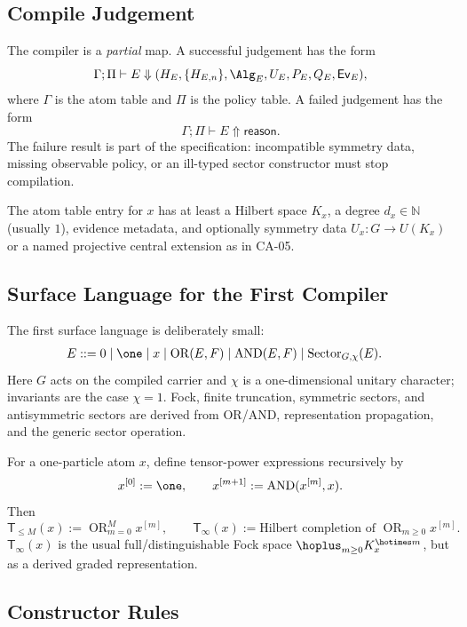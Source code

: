 \subsection{Compile Judgement}

The compiler is a \emph{partial} map.  A successful judgement has the form
\[
  \Gamma;\Pi \vdash E \Downarrow
  (H_E,\{H_{E,n}\},\Alg_E,U_E,P_E,Q_E,\mathsf{Ev}_E),
\]
where \(\Gamma\) is the atom table and \(\Pi\) is the policy table.  A failed
judgement has the form
\[
  \Gamma;\Pi \vdash E \Uparrow \mathsf{reason}.
\]
The failure result is part of the specification: incompatible symmetry data,
missing observable policy, or an ill-typed sector constructor must stop compilation.

The atom table entry for \(x\) has at least a Hilbert space \(K_x\), a degree
\(d_x\in\mathbb N\) (usually \(1\)), evidence metadata, and optionally symmetry
data \(U_x:G\to U(K_x)\) or a named projective central extension as in CA-05.

\subsection{Surface Language for the First Compiler}

The first surface language is deliberately small:
\[
\begin{aligned}
E ::= {}& 0 \mid \one \mid x
       \mid \operatorname{OR}(E,F)
       \mid \operatorname{AND}(E,F)
       \mid \operatorname{Sector}_{G,\chi}(E).
\end{aligned}
\]
Here \(G\) acts on the compiled carrier and \(\chi\) is a one-dimensional unitary
character; invariants are the case \(\chi=1\).  Fock, finite truncation,
symmetric sectors, and antisymmetric sectors are derived from OR/AND,
representation propagation, and the generic sector operation.

For a one-particle atom \(x\), define tensor-power expressions recursively by
\[
  x^{[0]}:=\one,\qquad x^{[m+1]}:=\operatorname{AND}(x^{[m]},x).
\]
Then
\[
  \mathsf T_{\le M}(x):=\operatorname{OR}_{m=0}^{M}x^{[m]},\qquad
  \mathsf T_{\infty}(x):=\text{Hilbert completion of } \operatorname{OR}_{m\ge0}x^{[m]}.
\]
\(\mathsf T_{\infty}(x)\) is the usual full/distinguishable Fock space
\(\hoplus_{m\ge0}K_x^{\hotimes m}\), but as a derived graded representation.

\subsection{Constructor Rules}

